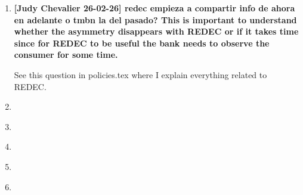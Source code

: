 \documentclass[12pt]{article}
\theoremstyle{plain}
\theoremstyle{plain}
\theoremstyle{definition}  %
\theoremstyle{remark}  %
\begin{document}
\begin{enumerate}
    Finally, the best answer is that I am interesting in the market and data and I am trying to find the correct model. Is not that I am interested in switching costs and persistent heterogeneity per se. 

    \item \textbf{[Judy Chevalier 26-02-26] redec empieza a compartir info de ahora en adelante o tmbn la del pasado? This is important to understand whether the asymmetry disappears with REDEC or if it takes time since for REDEC to be useful the bank needs to observe the consumer for some time.}
    
    See this question in policies.tex where I explain everything related to REDEC. 
    
    
    \item \textbf{}
    
    \item \textbf{}
    
    \item \textbf{}
    
    \item \textbf{}
    \item \textbf{}
\end{enumerate}
\end{document}
